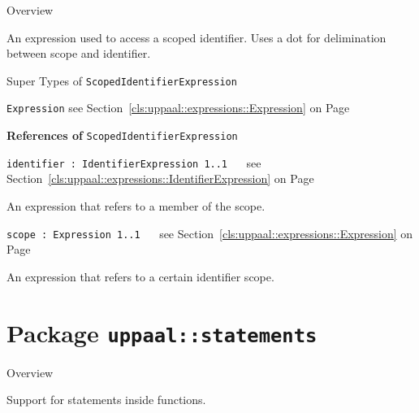 	\begin{longdescription}
		\item[Overview] 		
				

	

		An expression used to access a scoped identifier. Uses a dot for delimination between scope and identifier.		
		\item[Super Types of \texttt{ScopedIdentifierExpression}] ~
			\begin{longdescription}
				\item[\texttt{Expression}] see Section~\ref{cls:uppaal::expressions::Expression} on Page~\pageref{cls:uppaal::expressions::Expression}						\end{longdescription}
		
	
			\item[\textbf{References of} \texttt{ScopedIdentifierExpression}] ~
			\begin{longdescription}
	\item[\texttt{identifier : IdentifierExpression 	\symbol{"5B}1..1\symbol{"5D}
}] ~
	see Section~\ref{cls:uppaal::expressions::IdentifierExpression} on Page~\pageref{cls:uppaal::expressions::IdentifierExpression}
	
	\nopagebreak
		
				

	

		An expression that refers to a member of the scope.		
	\item[\texttt{scope : Expression 	\symbol{"5B}1..1\symbol{"5D}
}] ~
	see Section~\ref{cls:uppaal::expressions::Expression} on Page~\pageref{cls:uppaal::expressions::Expression}
	
	\nopagebreak
		
				

	

		An expression that refers to a certain identifier scope.		
			\end{longdescription}
	
	\end{longdescription}
	
			\newpage
		\section{Package \bfseries \texttt{uppaal::statements}\normalfont}
		
		\begin{longdescription}
		\item[Overview]			
				

	

		Support for statements inside functions.		
		\end{longdescription}
	

